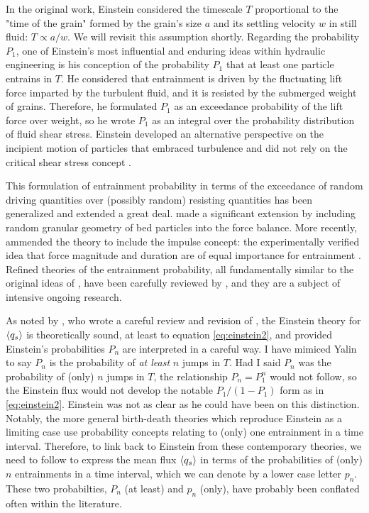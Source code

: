 In the original work, Einstein considered the timescale $T$ proportional to the "time of the grain" formed by the grain's size $a$ and its settling velocity $w$ in still fluid: $T \propto a/w$. 
We will revisit this assumption shortly. 
Regarding the probability $P_1$, one of Einstein's most influential and enduring ideas within hydraulic engineering is his conception of the probability $P_1$ that at least one particle entrains in $T$. 
He considered that entrainment is driven by the fluctuating lift force imparted by the turbulent fluid, and it is resisted by the submerged weight of grains. 
Therefore, he formulated $P_1$ as an exceedance probability of the lift force over weight, so he wrote $P_1$ as an integral over the probability distribution of fluid shear stress. 
Einstein developed an alternative perspective on the incipient motion of particles that embraced turbulence and did not rely on the critical shear stress concept \citep[e.g.][]{Shields1936}.

This formulation of entrainment probability in terms of the exceedance of random driving quantities over (possibly random) resisting quantities has been generalized and extended a great deal. 
\citet{Paintal1971} made a significant extension by including random granular geometry of bed particles into the force balance. 
More recently, \citet{Tregnaghi2012} ammended the theory to include the impulse concept: the experimentally verified idea that force magnitude and duration are of equal importance for entrainment \citep[e.g.][]{Diplas2008, Celik2014}. 
Refined theories of the entrainment probability, all fundamentally similar to the original ideas of \citet{Einstein1950}, have been carefully reviewed by \citet{Dey2008, Dey2018}, and they are a subject of intensive ongoing research.  

As noted by \citet{Yalin1972}, who wrote a careful review and revision of \citet{Einstein1950}, the Einstein theory for $\langle q_s \rangle$ is theoretically sound, at least to equation \ref{eq:einstein2}, and provided Einstein's probabilities $P_n$ are interpreted in a careful way. 
I have mimiced Yalin to say $P_n$ is the probability of \textit{at least} $n$ jumps in $T$. 
Had I said $P_n$ was the probability of (only) $n$ jumps in $T$, the relationship $P_n = P_1^n$ would not follow, so the Einstein flux would not develop the notable $P_1/(1-P_1)$ form as in \ref{eq:einstein2}. 
Einstein was not as clear as he could have been on this distinction. 
Notably, the more general birth-death theories which reproduce Einstein as a limiting case \citep[e.g.][]{Ancey2006} use probability concepts relating to (only) one entrainment in a time interval. 
Therefore, to link back to Einstein from these contemporary theories, we need to follow \citet{Yalin1972} to express the mean flux $\langle q_s \rangle$ in terms of the probabilities of (only) $n$ entrainments in a time interval, which we can denote by a lower case letter $p_n$. 
These two probabilties, $P_n$ (at least) and $p_n$ (only), have probably been conflated often within the literature. 

